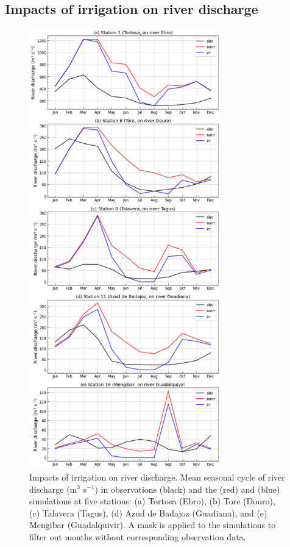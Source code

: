 \subsection{Impacts of irrigation on river discharge}

\begin{figure}[htbp]
    \centering
    \includegraphics[width=8.3cm]{images/chap4/article/f05.png} 
    \caption{Impacts of irrigation on river discharge. Mean seasonal cycle of river discharge (m$^3$ s$^{-1}$) in observations (black) and the \noirr (red) and \irr (blue) simulations at five stations: (a) Tortosa (Ebro), (b) Tore (Douro), (c) Talavera (Tagus), (d) Azud de Badajoz (Guadiana), and (e) Mengibar (Guadalquivir). A mask is applied to the simulations to filter out months without corresponding observation data.}
    \label{fig:discharge_SC}
\end{figure}

